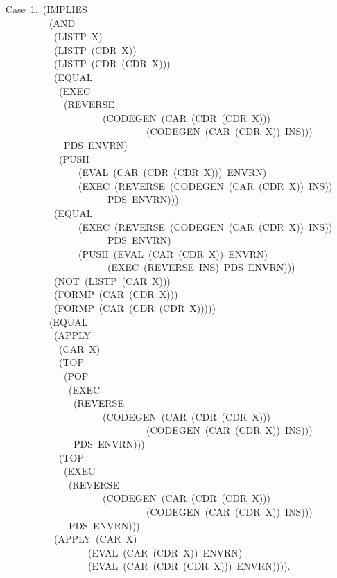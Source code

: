 \documentclass[10pt]{book}
\newenvironment{pubasis}{\begin{flushleft}}{\end{flushleft}}
\begin{document}
\begin{pubasis}
~~Case~1.~(IMPLIES\\
~~~~~~~~~~~(AND\\
~~~~~~~~~~~~(LISTP~X)\\
~~~~~~~~~~~~(LISTP~(CDR~X))\\
~~~~~~~~~~~~(LISTP~(CDR~(CDR~X)))\\
~~~~~~~~~~~~(EQUAL\\
~~~~~~~~~~~~~(EXEC\\
~~~~~~~~~~~~~~(REVERSE\\
~~~~~~~~~~~~~~~~~~~~~~(CODEGEN~(CAR~(CDR~(CDR~X)))\\
~~~~~~~~~~~~~~~~~~~~~~~~~~~~~~~(CODEGEN~(CAR~(CDR~X))~INS)))\\
~~~~~~~~~~~~~~PDS~ENVRN)\\
~~~~~~~~~~~~~(PUSH\\
~~~~~~~~~~~~~~~~~(EVAL~(CAR~(CDR~(CDR~X)))~ENVRN)\\
~~~~~~~~~~~~~~~~~(EXEC~(REVERSE~(CODEGEN~(CAR~(CDR~X))~INS))\\
~~~~~~~~~~~~~~~~~~~~~~~PDS~ENVRN)))\\
~~~~~~~~~~~~(EQUAL\\
~~~~~~~~~~~~~~~~~(EXEC~(REVERSE~(CODEGEN~(CAR~(CDR~X))~INS))\\
~~~~~~~~~~~~~~~~~~~~~~~PDS~ENVRN)\\
~~~~~~~~~~~~~~~~~(PUSH~(EVAL~(CAR~(CDR~X))~ENVRN)\\
~~~~~~~~~~~~~~~~~~~~~~~(EXEC~(REVERSE~INS)~PDS~ENVRN)))\\
~~~~~~~~~~~~(NOT~(LISTP~(CAR~X)))\\
~~~~~~~~~~~~(FORMP~(CAR~(CDR~X)))\\
~~~~~~~~~~~~(FORMP~(CAR~(CDR~(CDR~X)))))\\
~~~~~~~~~~~(EQUAL\\
~~~~~~~~~~~~(APPLY\\
~~~~~~~~~~~~~(CAR~X)\\
~~~~~~~~~~~~~(TOP\\
~~~~~~~~~~~~~~(POP\\
~~~~~~~~~~~~~~~(EXEC\\
~~~~~~~~~~~~~~~~(REVERSE\\
~~~~~~~~~~~~~~~~~~~~~~(CODEGEN~(CAR~(CDR~(CDR~X)))\\
~~~~~~~~~~~~~~~~~~~~~~~~~~~~~~~(CODEGEN~(CAR~(CDR~X))~INS)))\\
~~~~~~~~~~~~~~~~PDS~ENVRN)))\\
~~~~~~~~~~~~~(TOP\\
~~~~~~~~~~~~~~(EXEC\\
~~~~~~~~~~~~~~~(REVERSE\\
~~~~~~~~~~~~~~~~~~~~~~(CODEGEN~(CAR~(CDR~(CDR~X)))\\
~~~~~~~~~~~~~~~~~~~~~~~~~~~~~~~(CODEGEN~(CAR~(CDR~X))~INS)))\\
~~~~~~~~~~~~~~~PDS~ENVRN)))\\
~~~~~~~~~~~~(APPLY~(CAR~X)\\
~~~~~~~~~~~~~~~~~~~(EVAL~(CAR~(CDR~X))~ENVRN)\\
~~~~~~~~~~~~~~~~~~~(EVAL~(CAR~(CDR~(CDR~X)))~ENVRN)))).\\


\end{pubasis}
\end{document}
